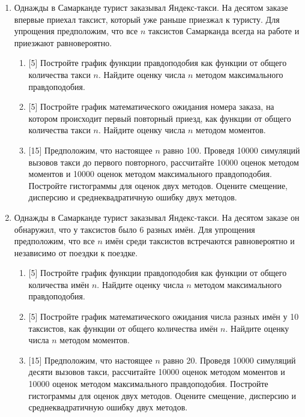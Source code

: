 \documentclass[12pt]{article} %
\begin{document}
\begin{enumerate}

    \item Однажды в Самарканде турист заказывал Яндекс-такси. 
    На десятом заказе впервые приехал таксист, который уже раньше приезжал к туристу. 
    Для упрощения предположим, что все $n$ таксистов Самарканда всегда на работе и приезжают равновероятно.

    \begin{enumerate}
      \item {[5]} Постройте график функции правдоподобия как функции от общего количества такси $n$. 
      Найдите оценку числа $n$ методом максимального правдоподобия. 
      \item {[5]} Постройте график математического ожидания номера заказа, 
      на котором происходит первый повторный приезд, как функции от общего количества такси $n$. 
      Найдите оценку числа $n$ методом моментов.
      \item {[15]} Предположим, что настоящее $n$ равно 100. 
      Проведя 10000 симуляций вызовов такси до первого повторного, рассчитайте 10000 оценок методом моментов и 10000 оценок методом максимального правдоподобия. 
      Постройте гистограммы для оценок двух методов. 
      Оцените смещение, дисперсию и среднеквадратичную ошибку двух методов. 
    \end{enumerate}

    \item Однажды в Самарканде турист заказывал Яндекс-такси. 
    На десятом заказе он обнаружил, что у таксистов было 6 разных имён.
    Для упрощения предположим, что все $n$ имён среди таксистов встречаются равновероятно и независимо от 
    поездки к поездке. 

    \begin{enumerate}
      \item {[5]} Постройте график функции правдоподобия как функции от общего количества имён $n$. 
      Найдите оценку числа $n$ методом максимального правдоподобия. 
      \item {[5]} Постройте график математического ожидания числа разных имён у 10 таксистов, 
      как функции от общего количества имён $n$. 
      Найдите оценку числа $n$ методом моментов.
      \item {[15]} Предположим, что настоящее $n$ равно 20. 
      Проведя 10000 симуляций десяти вызовов такси, рассчитайте 10000 оценок методом моментов и 10000 оценок методом максимального правдоподобия. 
      Постройте гистограммы для оценок двух методов. 
      Оцените смещение, дисперсию и среднеквадратичную ошибку двух методов. 


\end{enumerate}
\end{enumerate}
\end{document}
